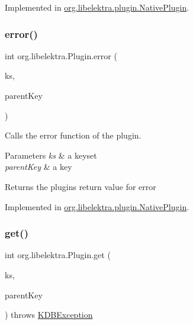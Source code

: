 Implemented in \hyperlink{classorg_1_1libelektra_1_1plugin_1_1NativePlugin_acd6f4e0e81a11a1eba64dfa164c67a1f}{org.\+libelektra.\+plugin.\+Native\+Plugin}.

\mbox{\label{interfaceorg_1_1libelektra_1_1Plugin_aa91370570c862ebe9eb83094a4731b9a}} 
\subsubsection{\texorpdfstring{error()}{error()}}
{\footnotesize\ttfamily int org.\+libelektra.\+Plugin.\+error (\begin{DoxyParamCaption}\item[{\hyperlink{classorg_1_1libelektra_1_1KeySet}{Key\+Set}}]{ks,  }\item[{\hyperlink{classorg_1_1libelektra_1_1Key}{Key}}]{parent\+Key }\end{DoxyParamCaption})}



Calls the error function of the plugin. 


\begin{DoxyParams}{Parameters}
{\em ks} & a keyset \\
\hline
{\em parent\+Key} & a key \\
\hline
\end{DoxyParams}
\begin{DoxyReturn}{Returns}
the plugin\textquotesingle{}s return value for error 
\end{DoxyReturn}


Implemented in \hyperlink{classorg_1_1libelektra_1_1plugin_1_1NativePlugin_a54c2753b1d17e14be39526a6ff02e34d}{org.\+libelektra.\+plugin.\+Native\+Plugin}.

\mbox{\label{interfaceorg_1_1libelektra_1_1Plugin_a9b8362549b7ab8ca5eff39cf6b7c8046}} 
\subsubsection{\texorpdfstring{get()}{get()}}
{\footnotesize\ttfamily int org.\+libelektra.\+Plugin.\+get (\begin{DoxyParamCaption}\item[{\hyperlink{classorg_1_1libelektra_1_1KeySet}{Key\+Set}}]{ks,  }\item[{\hyperlink{classorg_1_1libelektra_1_1Key}{Key}}]{parent\+Key }\end{DoxyParamCaption}) throws \hyperlink{classorg_1_1libelektra_1_1exception_1_1KDBException}{K\+D\+B\+Exception}}



